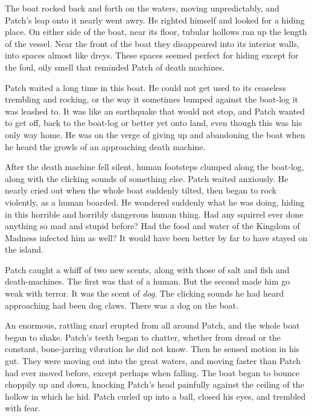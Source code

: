 \documentclass[11pt]{article}
\begin{document}
 The boat rocked back and forth on the waters, moving unpredictably, and Patch's leap onto it nearly went awry. He righted himself and looked for a hiding place. On either side of the boat, near its floor, tubular hollows ran up the length of the vessel. Near the front of the boat they disappeared into its interior walls, into spaces almost like dreys. These spaces seemed perfect for hiding %
 except for the foul, oily smell that reminded Patch of death machines.\par
 Patch waited a long time in this boat. He could not get used to its ceaseless trembling and rocking, or the way it sometimes bumped against the boat-log it was leashed to. It was like an earthquake that would not stop, and Patch wanted to get off, back to the boat-log or better yet onto land, even though this was his only way home. He was on the verge of giving up and abandoning the boat when he heard the growls of an approaching death machine.\par
 After the death machine fell silent, human footsteps clumped along the boat-log, along with the clicking sounds of something else. Patch waited anxiously. He nearly cried out when the whole boat suddenly tilted, then began to rock violently, as a human boarded. He wondered suddenly what he was doing, hiding in this horrible and horribly dangerous human thing. Had any squirrel ever done anything so mad and stupid before? Had the food and water of the Kingdom of Madness infected him as well? It would have been better by far to have stayed on the island.\par
 Patch caught a whiff of two new scents, along with those of salt and fish and death-machines. The first was that of a human. But the second made him go weak with terror. It was the scent of {\it dog}. The clicking sounds he had heard approaching had been dog claws. There was a dog on the boat.\par
 An enormous, rattling snarl erupted from all around Patch, and the whole boat began to shake. Patch's teeth began to chatter, whether from dread or the constant, bone-jarring vibration he did not know. Then he sensed motion in his gut. They were moving out into the great waters, and moving faster than Patch had ever moved before, except perhaps when falling. The boat began to bounce choppily up and down, knocking Patch's head painfully against the ceiling of the hollow in which he hid. Patch curled up into a ball, closed his eyes, and trembled with fear.\par
\par
\end{document}

